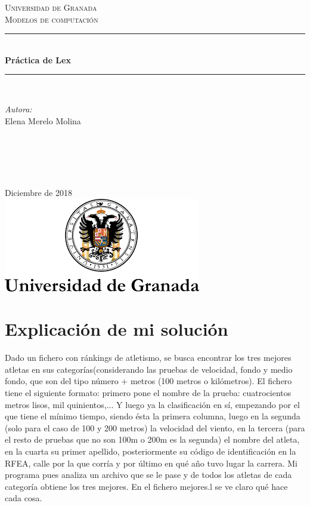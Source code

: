 \documentclass[12pt]{article}
\begin{document}
\begin{titlepage}
\newcommand{\HRule}{\rule{\linewidth}{0.5mm}}
\center
\textsc{\LARGE Universidad de Granada}\\[1.5cm] %
\textsc{\Large Modelos de computación}\\[0.5cm] %
\HRule \\[0.4cm]
{ \huge \bfseries Práctica de Lex}\\[0.4cm] %
\HRule \\[1.5cm]
\begin{minipage}{0.4\textwidth}
\begin{flushleft} \large
\emph{Autora:}\\
Elena Merelo Molina \textsc{} %
\end{flushleft}
\end{minipage}
~
\begin{minipage}{0.4\textwidth}
\begin{flushright} \large
\emph{} \\
\textsc{} %
\end{flushright}
\end{minipage}\\[2cm]
{\large Diciembre de 2018}\\[2cm] %
\includegraphics[scale=0.5]{./logo.png}
\vfill %
\end{titlepage}


\section{Explicación de mi solución}
Dado un fichero con ránkings de atletismo, se busca encontrar los tres mejores atletas en sus categorías(considerando las pruebas de velocidad, fondo y medio fondo, que son del tipo número + metros (100 metros o kilómetros). El fichero tiene el siguiente formato: primero pone el nombre de la prueba: cuatrocientos metros lisos, mil quinientos,... Y luego ya la clasificación en sí, empezando por el que tiene el mínimo tiempo, siendo ésta la primera columna, luego en la segunda (solo para el caso de 100 y 200 metros) la velocidad del viento, en la tercera (para el resto de pruebas que no son 100m o 200m es la segunda) el nombre del atleta, en la cuarta su primer apellido, posteriormente su código de identificación en la RFEA, calle por la que corría y por último en qué año tuvo lugar la carrera. Mi programa pues analiza un archivo que se le pase y de todos los atletas de cada categoría obtiene los tres mejores. En el fichero mejores.l se ve claro qué hace cada cosa.
\end{document}
